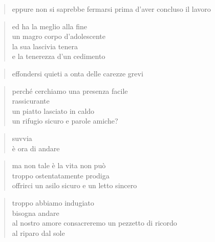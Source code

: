 	\begin{verse}
                eppure non si saprebbe fermarsi prima d’aver concluso il lavoro
	\end{verse}

	\begin{verse}
                ed ha la meglio alla fine\\
                un magro corpo d’adolescente\\
                la sua lascivia tenera\\
                e la tenerezza d’un cedimento
	\end{verse}

	\begin{verse}
                effondersi quieti a onta delle carezze grevi
	\end{verse}

\clearpage


\vspace*{2cm}

	\begin{verse}
                perché cerchiamo una presenza facile\\
                rassicurante\\
                un piatto lasciato in caldo\\
                un rifugio sicuro e parole amiche?
	\end{verse}

	\begin{verse}
                suvvia\\
                è ora di andare
	\end{verse}

	\begin{verse}
                ma non tale è la vita non può\\
                troppo ostentatamente prodiga\\
                offrirci un asilo sicuro e un letto sincero
	\end{verse}

	\begin{verse}
                troppo abbiamo indugiato\\
                bisogna andare\\
                al nostro amore consacreremo un pezzetto di ricordo\\
                al riparo dal sole
	\end{verse}

